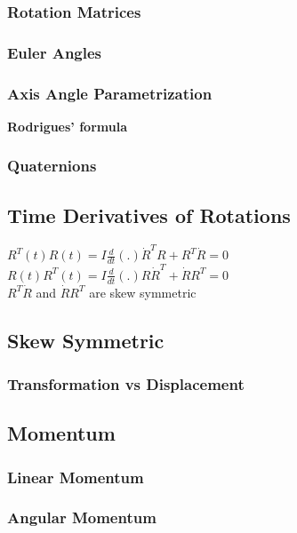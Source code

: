 \subsubsection{Rotation Matrices}

\subsubsection{Euler Angles}

\subsubsection{Axis Angle Parametrization}
\textbf{Rodrigues' formula}

\subsubsection{Quaternions}


\subsection{Time Derivatives of Rotations}
$R^T(t)R(t) =I	\frac{d}{dt}(.) \dot{R}^TR+R^T\dot{R}=0$
\\

$R(t)R^T(t) =I	\frac{d}{dt}(.) R\dot{R}^T+\dot{R}R^T=0$
\\

$R^T\dot{R}$ and $\dot{R}R^T$ are skew symmetric

\subsection{Skew Symmetric}

\subsubsection{Transformation vs Displacement}

\subsection{Momentum}

\subsubsection{Linear Momentum}

\subsubsection{Angular Momentum}

